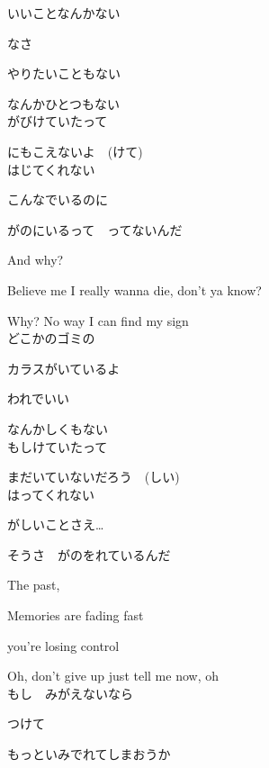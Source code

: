 いいことなんかない

なさ

やりたいこともない

なんかひとつもない
\\

がびけていたって

にもこえないよ　(けて)
\\

はじてくれない

こんなでいるのに

がのにいるって　ってないんだ

And why?

Believe me I really wanna die, don't ya know?

Why? No way I can find my sign
\\

どこかのゴミの

カラスがいているよ

われでいい

なんかしくもない
\\

もしけていたって

まだいていないだろう　(しい)
\\

はってくれない

がしいことさえ…

そうさ　がのをれているんだ

The past,

Memories are fading fast

you're losing control

Oh, don't give up just tell me now, oh
\\

もし　みがえないなら

つけて

もっといみでれてしまおうか

